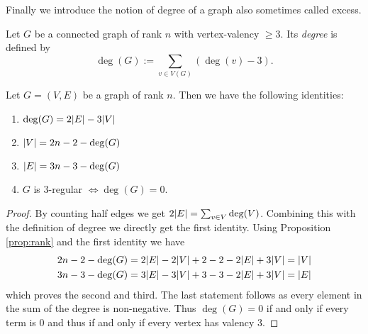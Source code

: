 Finally we introduce the notion of degree of a graph also sometimes called excess.
\begin{definition}
	Let $G$ be a connected graph of rank $n$ with vertex-valency $\geq 3$. Its \emph{degree} is defined by
	\[
		\deg(G) := \sum_{v \in V(G)} (\deg(v) - 3)
	.\] 
\end{definition}

\begin{proposition}
	Let $G = (V,E)$ be a graph of rank $n$. Then we have the following identities:
	\begin{enumerate}
		\item $\deg(G) = 2 \abs{E} - 3 \abs{V}$
		\item $\abs{V} = 2n -2 - \deg(G)$
		\item $\abs{E} = 3n - 3 - \deg(G)$
		\item $G$ is $3$-regular $\Leftrightarrow \deg(G) = 0$.
	\end{enumerate}	
\end{proposition}

\begin{proof}
	By counting half edges we get $2 \abs{E} = \sum_{v \in V} \deg(V)$.
	Combining this with the definition of degree we directly get the first identity.
	Using Proposition \ref{prop:rank} and the first identity we have
	\begin{align*}
		2 n -2 - \deg(G) &= 2 \abs{E} - 2 \abs{V} + 2 - 2 - 2\abs{E} + 3 \abs{V} = \abs{V}\\
		3 n -3 - \deg(G) &= 3 \abs{E} - 3 \abs{V} + 3 - 3 - 2\abs{E} + 3 \abs{V} = \abs{E}
	\end{align*}
	which proves the second and third. The last statement follows as every element in the sum of the degree is non-negative.
	Thus $\deg(G) = 0$ if and only if every term is $0$ and thus if and only if every vertex has valency $3$.
\end{proof}

